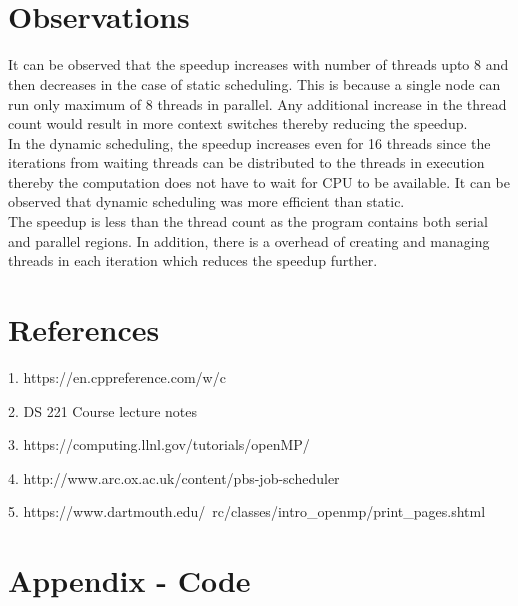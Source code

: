 \documentclass[11pt,a4paper,oneside]{article}
\begin{document}
	\begin{verbatim}
	 
	 
	\end{verbatim}
     
    \section{Observations}
    It can be observed that the speedup increases with number of threads upto 8 and then decreases in the case of static scheduling. This is because a single node can run only maximum of 8 threads in parallel. Any additional increase in the thread count would result in more context switches thereby reducing the speedup. \\
    \newline
    In the dynamic scheduling, the speedup increases even for 16 threads since the iterations from waiting threads can be distributed to the threads in execution thereby the computation does not have to wait for CPU to be available. It can be observed that dynamic scheduling was more efficient than static.  \\
    \newline
    The speedup is less than the thread count as the program contains both serial and parallel regions. In addition, there is a overhead of creating and managing threads in each iteration which reduces the speedup further.     
    
    \section{References}
    \begin{list}{}{}
    	\item 1. https://en.cppreference.com/w/c
    	\item 2. DS 221 Course lecture notes
    	\item 3. https://computing.llnl.gov/tutorials/openMP/
    	\item 4. http://www.arc.ox.ac.uk/content/pbs-job-scheduler
    	\item 5. https://www.dartmouth.edu/~rc/classes/intro\_openmp/print\_pages.shtml
    \end{list}

    \section{Appendix - Code} 
    
\end{document}

